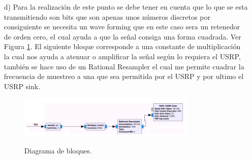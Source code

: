 \begin{itemize}
\item[d)]
 Para la realización de este punto se debe tener en cuenta que lo que se esta transmitiendo son bits que son apenas unos números discretos por consiguiente se necesita un wave forming que en este caso sera un retenedor de orden cero, el cual ayuda a que la señal consiga una forma cuadrada. Ver Figura \ref{fig:ejerciciodiagbloq}. El siguiente bloque corresponde a una constante de multiplicación la cual nos ayuda a atenuar o amplificar la señal según lo requiera el USRP, también se hace uso de un Rational Resampler el cual me permite cuadrar la frecuencia de muestreo a una que sea permitida por el USRP y por ultimo el USRP sink.
 
 \begin{figure}[h!]
	\captionsetup{justification = raggedright, singlelinecheck = false}
    \caption{Diagrama de bloques.}
    \centering
    \includegraphics[width=0.8\textwidth]{Imagenes/bloques.png}
    \label{fig:ejerciciodiagbloq}
\end{figure}

\end{itemize}



